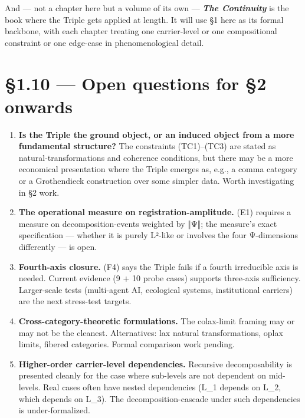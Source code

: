 \documentclass[11pt, openany]{book}
\newcommand{\sectionbreak}{\clearpage}
\begin{document}
And --- not a chapter here but a volume of its own --- \textbf{\textit{The Continuity}} is the book where the Triple gets applied at length. It will use §1 here as its formal backbone, with each chapter treating one carrier-level or one compositional constraint or one edge-case in phenomenological detail.

\sectionbreak

\section{§1.10 --- Open questions for §2 onwards}

\begin{enumerate}
\item \textbf{Is the Triple the ground object, or an induced object from a more fundamental structure?} The constraints (TC1)–(TC3) are stated as natural-transformations and coherence conditions, but there may be a more economical presentation where the Triple emerges as, e.g., a comma category or a Grothendieck construction over some simpler data. Worth investigating in §2 work.

\item \textbf{The operational measure on registration-amplitude.} (E1) requires a measure on decomposition-events weighted by ‖Ψ‖; the measure's exact specification --- whether it is purely L²-like or involves the four Ψ-dimensions differently --- is open.

\item \textbf{Fourth-axis closure.} (F4) says the Triple fails if a fourth irreducible axis is needed. Current evidence (9 + 10 probe cases) supports three-axis sufficiency. Larger-scale tests (multi-agent AI, ecological systems, institutional carriers) are the next stress-test targets.

\item \textbf{Cross-category-theoretic formulations.} The colax-limit framing may or may not be the cleanest. Alternatives: lax natural transformations, oplax limits, fibered categories. Formal comparison work pending.

\item \textbf{Higher-order carrier-level dependencies.} Recursive decomposability is presented cleanly for the case where sub-levels are not dependent on mid-levels. Real cases often have nested dependencies (L\_\allowbreak{}1 depends on L\_\allowbreak{}2, which depends on L\_\allowbreak{}3). The decomposition-cascade under such dependencies is under-formalized.
\end{enumerate}
\end{document}
